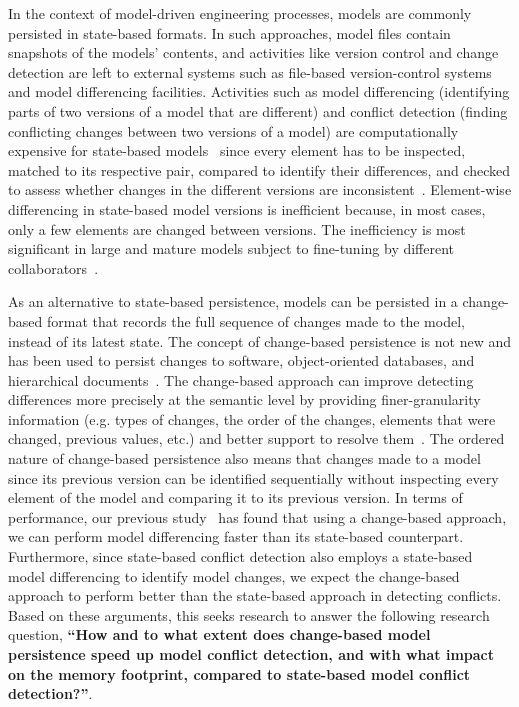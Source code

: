 In the context of model-driven engineering processes, models are commonly persisted in state-based formats. In such approaches, model files contain snapshots of the models' contents, and activities like version control and change detection are left to external systems such as file-based version-control systems and model differencing facilities. Activities such as model differencing (identifying parts of two versions of a model that are different) and conflict detection (finding conflicting changes between two versions of a model) are computationally expensive for state-based models~\cite{Kolovos:2009:DMM:1564596.1564641} since every element has to be inspected, matched to its respective pair, compared to identify their differences, and checked to assess whether changes in the different versions are inconsistent~\cite{emfcompare2018developer}. Element-wise differencing in state-based model versions is inefficient because, in most cases, only a few elements are changed between versions. The inefficiency is most significant in large and mature models subject to fine-tuning by different collaborators~\cite{selic2003pragmatics}. 

As an alternative to state-based persistence, models can be persisted in a change-based format that records the full sequence of changes made to the model, instead of its latest state. The concept of change-based persistence is not new and has been used to persist changes to software, object-oriented databases, and hierarchical documents~\cite{DBLP:journals/entcs/RobbesL07,DBLP:conf/sde/LippeO92,DBLP:conf/caise/IgnatN05}. The change-based approach can improve detecting differences more precisely at the semantic level by providing finer-granularity information (e.g. types of changes, the order of the changes, 
elements that were changed, previous values, etc.) and better support to resolve them~\cite{mens2002state}. The ordered nature of change-based persistence also means that changes made to a model since its previous version can be identified sequentially without inspecting every element of the model and comparing it to its previous version. 
In terms of performance, our previous study~\cite{yohannis2019efficient} has found that using a change-based approach, we can perform model differencing faster than its state-based counterpart. Furthermore, since state-based conflict detection also employs a state-based model differencing to identify model changes, we expect the change-based approach to perform better than the state-based approach in detecting conflicts. Based on these arguments, this seeks research to answer the following research question, \textbf{``How and to what extent does change-based model persistence speed up model conflict detection, and with what impact on the memory footprint, compared to state-based model conflict detection?''}. 

